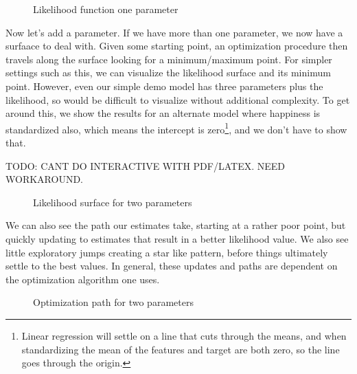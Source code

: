 \documentclass[
  letterpaper,
]{krantz}
\begin{document}
\begin{figure}[H]


\caption{\label{fig-r-likelihood-plot}Likelihood function one parameter}

\end{figure}%

Now let's add a parameter. If we have more than one parameter, we now
have a surfaace to deal with. Given some starting point, an optimization
procedure then travels along the surface looking for a minimum/maximum
point. For simpler settings such as this, we can visualize the
likelihood surface and its minimum point. However, even our simple demo
model has three parameters plus the likelihood, so would be difficult to
visualize without additional complexity. To get around this, we show the
results for an alternate model where happiness is standardized also,
which means the intercept is zero\footnote{Linear regression will settle
  on a line that cuts through the means, and when standardizing the mean
  of the features and target are both zero, so the line goes through the
  origin.}, and we don't have to show that.

TODO: CANT DO INTERACTIVE WITH PDF/LATEX. NEED WORKAROUND.

\begin{figure}[H]


\caption{\label{fig-show-r-likelihood-surface}Likelihood surface for two
parameters}

\end{figure}%

We can also see the path our estimates take, starting at a rather poor
point, but quickly updating to estimates that result in a better
likelihood value. We also see little exploratory jumps creating a star
like pattern, before things ultimately settle to the best values. In
general, these updates and paths are dependent on the optimization
algorithm one uses.

\begin{figure}[H]


\caption{\label{fig-r-likelihood-path}Optimization path for two
parameters}

\end{figure}%
\end{document}
